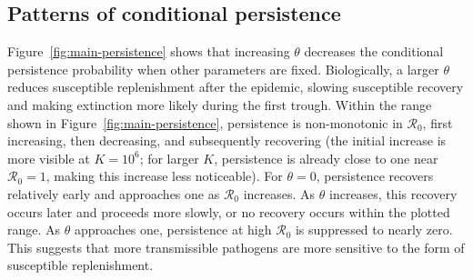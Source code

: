 \documentclass[11pt]{article}
\newcommand{\Rzero}{\mathcal R_0}
\newcommand{\rhoeps}{\rho}
\begin{document}
%
%
%

\subsection{Patterns of conditional persistence}
Figure~\ref{fig:main-persistence} shows that increasing \(\theta\) decreases the conditional persistence probability when other parameters are fixed. Biologically, a larger \(\theta\) reduces susceptible replenishment after the epidemic, slowing susceptible recovery and making extinction more likely during the first trough. Within the range shown in Figure~\ref{fig:main-persistence}, persistence is non-monotonic in \(\Rzero\), first increasing, then decreasing, and subsequently recovering (the initial increase is more visible at \(K=10^6\); for larger \(K\), persistence is already close to one near \(\Rzero=1\), making this increase less noticeable). For \(\theta=0\), persistence recovers relatively early and approaches one as \(\Rzero\) increases. As \(\theta\) increases, this recovery occurs later and proceeds more slowly, or no recovery occurs within the plotted range. As \(\theta\) approaches one, persistence at high \(\Rzero\) is suppressed to nearly zero. This suggests that more transmissible pathogens are more sensitive to the form of susceptible replenishment.
\end{document}
